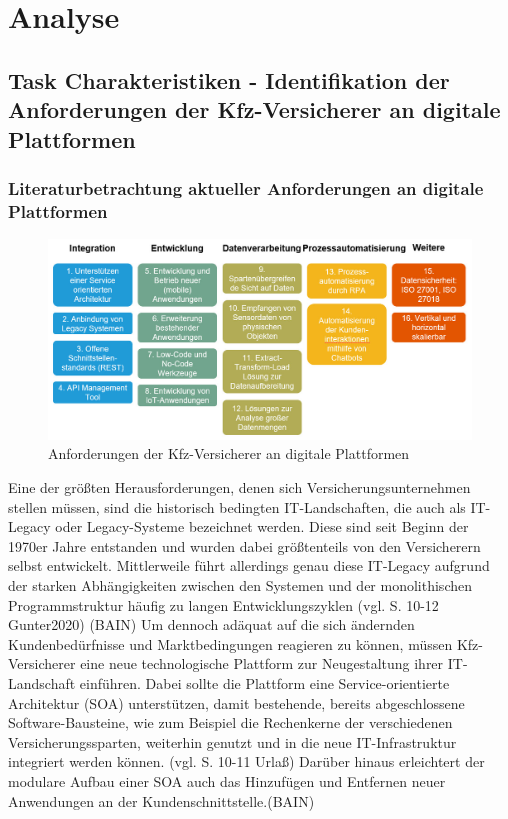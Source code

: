 \chapter{Analyse}
\section{Task Charakteristiken - Identifikation der Anforderungen der Kfz-Versicherer an digitale Plattformen}

\subsection{Literaturbetrachtung aktueller Anforderungen an digitale Plattformen}

\begin{figure}[h]
    \centering
    \includegraphics[width=1\textwidth]{img/PP_Anforderungen.jpg}
    \caption[Anforderungen der Kfz-Versicherer an digitale Plattformen]{Anforderungen der Kfz-Versicherer an digitale Plattformen\autocite{PPAnf}}
    \label{fig:PPAnf}
\end{figure}

Eine der größten Herausforderungen, denen sich Versicherungsunternehmen stellen müssen, sind die historisch bedingten IT-Landschaften, die auch als IT-Legacy oder Legacy-Systeme bezeichnet werden. Diese sind seit Beginn der 1970er Jahre entstanden und wurden dabei größtenteils von den Versicherern selbst entwickelt. Mittlerweile führt allerdings genau diese IT-Legacy aufgrund der starken Abhängigkeiten zwischen den Systemen und der monolithischen Programmstruktur häufig zu langen Entwicklungszyklen (vgl. S. 10-12 Gunter2020) (BAIN) Um dennoch adäquat auf die sich ändernden Kundenbedürfnisse und Marktbedingungen reagieren zu können, müssen Kfz-Versicherer eine neue technologische Plattform zur Neugestaltung ihrer IT-Landschaft einführen. Dabei sollte die Plattform eine Service-orientierte Architektur (SOA) unterstützen, damit bestehende, bereits abgeschlossene Software-Bausteine, wie zum Beispiel die Rechenkerne der verschiedenen Versicherungssparten, weiterhin genutzt und in die neue IT-Infrastruktur integriert werden können. (vgl. S. 10-11 Urlaß) Darüber hinaus erleichtert der modulare Aufbau einer SOA auch das Hinzufügen und Entfernen neuer Anwendungen an der Kundenschnittstelle.(BAIN)

